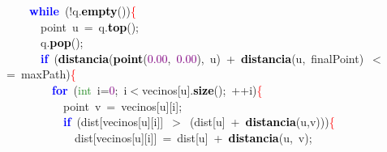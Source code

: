 \documentclass[10pt,a4paper,twoside]{article}
\begin{document}
{{{{{\mbox{}\ \ \ \ \textbf{\textcolor{Blue}{while}}\ \textcolor{BrickRed}{(!}q\textcolor{BrickRed}{.}\textbf{\textcolor{Black}{empty}}\textcolor{BrickRed}{())}\textcolor{Red}{\{} \\
\mbox{}\ \ \ \ \ \ point\ u\ \textcolor{BrickRed}{=}\ q\textcolor{BrickRed}{.}\textbf{\textcolor{Black}{top}}\textcolor{BrickRed}{();} \\
\mbox{}\ \ \ \ \ \ q\textcolor{BrickRed}{.}\textbf{\textcolor{Black}{pop}}\textcolor{BrickRed}{();} \\
\mbox{}\ \ \ \ \ \ \textbf{\textcolor{Blue}{if}}\ \textcolor{BrickRed}{(}\textbf{\textcolor{Black}{distancia}}\textcolor{BrickRed}{(}\textbf{\textcolor{Black}{point}}\textcolor{BrickRed}{(}\textcolor{Purple}{0.00}\textcolor{BrickRed}{,}\ \textcolor{Purple}{0.00}\textcolor{BrickRed}{),}\ u\textcolor{BrickRed}{)}\ \textcolor{BrickRed}{+}\ \textbf{\textcolor{Black}{distancia}}\textcolor{BrickRed}{(}u\textcolor{BrickRed}{,}\ finalPoint\textcolor{BrickRed}{)}\ \textcolor{BrickRed}{$<$=}\ maxPath\textcolor{BrickRed}{)}\textcolor{Red}{\{} \\
\mbox{}\ \ \ \ \ \ \ \ \textbf{\textcolor{Blue}{for}}\ \textcolor{BrickRed}{(}\textcolor{ForestGreen}{int}\ i\textcolor{BrickRed}{=}\textcolor{Purple}{0}\textcolor{BrickRed}{;}\ i\textcolor{BrickRed}{$<$}vecinos\textcolor{BrickRed}{[}u\textcolor{BrickRed}{].}\textbf{\textcolor{Black}{size}}\textcolor{BrickRed}{();}\ \textcolor{BrickRed}{++}i\textcolor{BrickRed}{)}\textcolor{Red}{\{} \\
\mbox{}\ \ \ \ \ \ \ \ \ \ point\ v\ \textcolor{BrickRed}{=}\ vecinos\textcolor{BrickRed}{[}u\textcolor{BrickRed}{][}i\textcolor{BrickRed}{];} \\
\mbox{}\ \ \ \ \ \ \ \ \ \ \textbf{\textcolor{Blue}{if}}\ \textcolor{BrickRed}{(}dist\textcolor{BrickRed}{[}vecinos\textcolor{BrickRed}{[}u\textcolor{BrickRed}{][}i\textcolor{BrickRed}{]]}\ \textcolor{BrickRed}{$>$}\ \textcolor{BrickRed}{(}dist\textcolor{BrickRed}{[}u\textcolor{BrickRed}{]}\ \textcolor{BrickRed}{+}\ \textbf{\textcolor{Black}{distancia}}\textcolor{BrickRed}{(}u\textcolor{BrickRed}{,}v\textcolor{BrickRed}{)))}\textcolor{Red}{\{} \\
\mbox{}\ \ \ \ \ \ \ \ \ \ \ \ dist\textcolor{BrickRed}{[}vecinos\textcolor{BrickRed}{[}u\textcolor{BrickRed}{][}i\textcolor{BrickRed}{]]}\ \textcolor{BrickRed}{=}\ dist\textcolor{BrickRed}{[}u\textcolor{BrickRed}{]}\ \textcolor{BrickRed}{+}\ \textbf{\textcolor{Black}{distancia}}\textcolor{BrickRed}{(}u\textcolor{BrickRed}{,}\ v\textcolor{BrickRed}{);} \\
}}}}}
\end{document}
